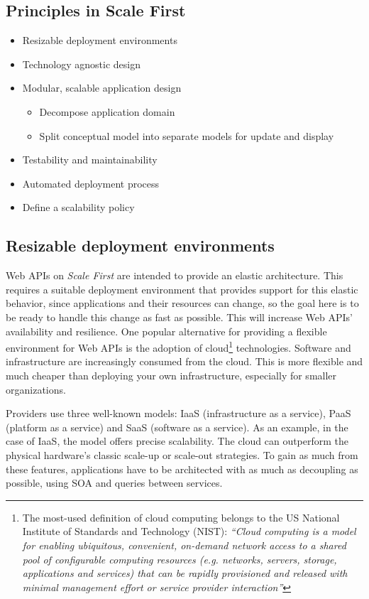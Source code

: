 \documentclass[10pt,article]{IEEEtran}
\begin{document}
 
\subsection{Principles in Scale First}
\begin{itemize}
    \item Resizable deployment environments
    \item Technology agnostic design
    \item Modular, scalable application design
    \begin{itemize}
        \item Decompose application domain 
        \item Split conceptual model into separate models for update and display
    \end{itemize}
    \item Testability and maintainability
    \item Automated deployment process
    \item Define a scalability policy
\end{itemize}

\subsection{Resizable deployment environments}
Web APIs on \textit{Scale First} are intended to provide an elastic architecture. This requires a suitable deployment environment that provides support for this elastic behavior, since applications and their resources can change, so the goal here is to be ready to handle this change as fast as possible. This will increase Web APIs' availability and resilience. One popular alternative for providing a flexible environment for Web APIs is the adoption of cloud\footnote{The most-used definition of cloud computing belongs to the US National Institute of Standards and Technology (NIST): \textit{``Cloud computing is a model for enabling ubiquitous, convenient, on-demand network access to a shared pool of configurable computing resources (e.g. networks, servers, storage, applications and services) that can be rapidly provisioned and released with minimal management effort or service provider interaction\cite{nist:cloud-definition}''}} technologies. Software and infrastructure are increasingly consumed from the cloud. This is more flexible and much cheaper than deploying your own infrastructure, especially for smaller organizations.

Providers use three well-known models: IaaS (infrastructure as a service), PaaS (platform as a service) and SaaS (software as a service). As an example, in the case of IaaS, the model offers precise scalability. The cloud can outperform the physical hardware's classic scale-up or scale-out strategies. To gain as much from these features, applications have to be architected with as much as decoupling as possible, using SOA and queries between services\cite{isw:cloud}.
\end{document}
